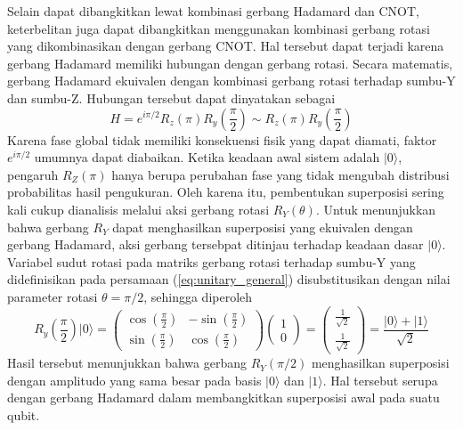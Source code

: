 Selain dapat dibangkitkan lewat kombinasi gerbang Hadamard dan CNOT, keterbelitan juga dapat dibangkitkan menggunakan kombinasi gerbang rotasi yang dikombinasikan dengan gerbang CNOT. Hal tersebut dapat terjadi karena gerbang Hadamard memiliki hubungan dengan gerbang rotasi. Secara matematis, gerbang Hadamard ekuivalen dengan kombinasi gerbang rotasi terhadap sumbu-Y dan sumbu-Z. Hubungan tersebut dapat dinyatakan sebagai
\begin{equation}
    \label{eq:hadamard_rotation_relation}
    H = e^{i\pi/2} R_z(\pi) R_y \left(\frac{\pi}{2}\right) \sim R_z(\pi)R_y \left(\frac{\pi}{2}\right)
\end{equation}
Karena fase global tidak memiliki konsekuensi fisik yang dapat diamati, faktor $e^{i\pi/2}$ umumnya dapat diabaikan. Ketika keadaan awal sistem adalah $|0\rangle$, pengaruh $R_Z (\pi)$ hanya berupa perubahan fase yang tidak mengubah distribusi probabilitas hasil pengukuran. Oleh karena itu, pembentukan superposisi sering kali cukup dianalisis melalui aksi gerbang rotasi $R_Y (\theta)$. Untuk menunjukkan bahwa gerbang $R_Y$ dapat menghasilkan superposisi yang ekuivalen dengan gerbang Hadamard, aksi gerbang tersebpat ditinjau terhadap keadaan dasar $|0\rangle$. Variabel sudut rotasi pada matriks gerbang rotasi terhadap sumbu-Y yang didefinisikan pada persamaan (\ref{eq:unitary_general}) disubstitusikan dengan nilai parameter rotasi $\theta = \pi/2$, sehingga diperoleh
\begin{equation}
    \label{eq:hadamard_rotation}
    R_y \left(\frac{\pi}{2}\right) |0\rangle = \begin{pmatrix} \cos(\frac{\pi}{2}) & -\sin(\frac{\pi}{2}) \\ \sin(\frac{\pi}{2}) & \cos(\frac{\pi}{2}) \end{pmatrix} \begin{pmatrix} 1 \\ 0 \end{pmatrix} = \begin{pmatrix} \frac{1}{\sqrt{2}} \\ \frac{1}{\sqrt{2}} \end{pmatrix} = \frac{|0\rangle + |1\rangle}{\sqrt{2}}
\end{equation}
Hasil tersebut menunjukkan bahwa gerbang $R_Y (\pi/2)$ menghasilkan superposisi dengan amplitudo yang sama besar pada basis $|0\rangle$ dan $|1\rangle$. Hal tersebut serupa dengan gerbang Hadamard dalam membangkitkan superposisi awal pada suatu qubit.

